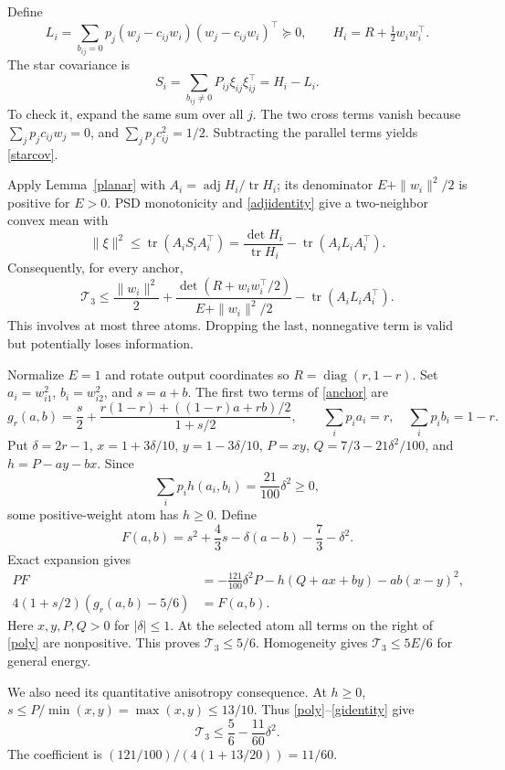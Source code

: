 \documentclass[10pt]{article}
\newcommand{\tr}{\operatorname{tr}}
\newcommand{\adj}{\operatorname{adj}}
\newcommand{\T}{\mathcal T_3}
\begin{document}
Define
\[
 L_i=\sum_{b_{ij}=0}p_j(w_j-c_{ij}w_i)(w_j-c_{ij}w_i)^\top\succeq0,
 \qquad H_i=R+\tfrac12w_iw_i^\top.
\]
The star covariance is
\begin{equation}\label{starcov}
 S_i=\sum_{b_{ij}\ne0}P_{ij}\xi_{ij}\xi_{ij}^\top=H_i-L_i.
\end{equation}
To check it, expand the same sum over all $j$. The two cross terms vanish
because $\sum_jp_jc_{ij}w_j=0$, and $\sum_jp_jc_{ij}^2=1/2$.
Subtracting the parallel terms yields \eqref{starcov}.

Apply Lemma~\ref{planar} with $A_i=\adj H_i/\tr H_i$; its denominator
$E+\|w_i\|^2/2$ is positive for $E>0$. PSD monotonicity and
\eqref{adjidentity} give a two-neighbor convex mean with
\[
 \|\xi\|^2\le\tr(A_iS_iA_i^\top)
 =\frac{\det H_i}{\tr H_i}-\tr(A_iL_iA_i^\top).
\]
Consequently, for every anchor,
\begin{equation}\label{anchor}
 \T\le \frac{\|w_i\|^2}{2}
 +\frac{\det(R+w_iw_i^\top/2)}{E+\|w_i\|^2/2}
 -\tr(A_iL_iA_i^\top).
\end{equation}
This involves at most three atoms. Dropping the last, nonnegative term is
valid but potentially loses information.

Normalize $E=1$ and rotate output coordinates so $R=\operatorname{diag}(r,1-r)$.
Set $a_i=w_{i1}^2$, $b_i=w_{i2}^2$, and $s=a+b$. The first two terms of
\eqref{anchor} are
\[
 g_r(a,b)=\frac{s}{2}+
 \frac{r(1-r)+((1-r)a+rb)/2}{1+s/2},\qquad
 \sum_i p_ia_i=r,\quad\sum_i p_ib_i=1-r.
\]
Put $\delta=2r-1$, $x=1+3\delta/10$, $y=1-3\delta/10$,
$P=xy$, $Q=7/3-21\delta^2/100$, and $h=P-ay-bx$.
Since
\[
 \sum_i p_i h(a_i,b_i)=\frac{21}{100}\delta^2\ge0,
\]
some positive-weight atom has $h\ge0$. Define
\[
 F(a,b)=s^2+\frac43s-\delta(a-b)-\frac73-\delta^2.
\]
Exact expansion gives
\begin{align}
 PF&=-\frac{121}{100}\delta^2P
     -h(Q+ax+by)-ab(x-y)^2,\label{poly}\\
 4(1+s/2)(g_r(a,b)-5/6)&=F(a,b).\label{gidentity}
\end{align}
Here $x,y,P,Q>0$ for $|\delta|\le1$. At the selected atom all terms on the
right of \eqref{poly} are nonpositive. This proves $\T\le5/6$.
Homogeneity gives $\T\le5E/6$ for general energy.

We also need its quantitative anisotropy consequence. At $h\ge0$,
$s\le P/\min(x,y)=\max(x,y)\le13/10$. Thus \eqref{poly}--\eqref{gidentity}
give
\begin{equation}\label{anisogap}
 \T\le\frac56-\frac{11}{60}\delta^2.
\end{equation}
The coefficient is $(121/100)/(4(1+13/20))=11/60$.
\end{document}
